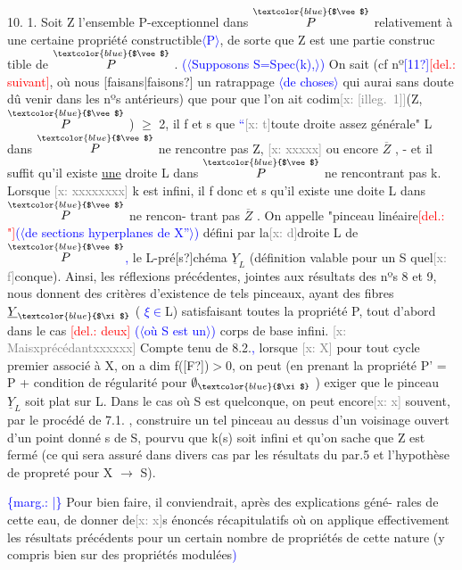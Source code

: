 \documentclass[11pt]{article}
\newcommand{\hand}[1]{\textcolor{blue}{#1}}
\let\over\relax
\newcommand{\over}[2]{\textcolor{gray}{#1}\textcolor{blue}{\ensuremath{^{\!\nearrow}}#2}}
\newcommand{\inserted}[2][]{\textcolor{blue}{$\langle$#2$\rangle$}}
\newcommand{\margin}[1]{\textcolor{blue}{\{\textsf{marg.:} #1\}}}
\newcommand{\deleted}[1]{\textcolor{red}{[\textsf{del.:} #1]}}
\newcommand{\xout}[1]{\textcolor{gray}{[\textsf{x:} #1]}}
\newcommand{\uline}[1]{\underline{#1}}
\newcommand{\unsure}[1]{[#1?]}
\newcommand{\illegible}[1]{[\textsf{illeg.\ #1}]}
\begin{document}
10. 1. Soit Z l'ensemble P-exceptionnel dans $\overset{\hand{$\vee$}}{P}$ relativement à une
certaine propriété constructible\inserted{P}, de sorte que Z est une partie construc%
tible de $\overset{\hand{$\vee$}}{P}$ . \hand{(}\inserted[typed]{Supposons S=Spec(k),}\hand{)} On sait (cf nº\hand{\unsure{11}}\deleted{suivant}, où nous \unsure{faisans|faisons} un ratrappage
\inserted{de choses} qui aurai\over{t}{ent} sans doute dû venir dans les nºs antérieurs) que pour que
l'on ait codim\xout{\illegible{1}}(Z,$\overset{\hand{$\vee$}}{P}$ ) $\geqslant$ 2, il f et s que \hand{``}\xout{t}toute droite assez
générale" L dans $\overset{\hand{$\vee$}}{P}$ ne rencontre pas Z, \xout{xxxxx} ou encore $\overline{Z}$ , - et il suffit
qu'il existe \uline{une} droite L dans $\overset{\hand{$\vee$}}{P}$ ne rencontrant pas k. Lorsque \xout{xxxxxxxx}
k est infini, il f donc et s qu'il existe une doite L dans $\overset{\hand{$\vee$}}{P}$ ne rencon-%
trant pas $\overline{Z}$ . On appelle "pinceau linéaire\deleted{"}\hand{(}\inserted[typed]{de sections hyperplanes de X\hand{''}}\hand{)} défini par la\xout{d}droite
L de $\overset{\hand{$\vee$}}{P}$\hand{,} le L-pré\unsure{s}chéma $\underline{Y}_L$ (définition valable pour un S quel\xout{f}conque).
Ainsi, les réflexions précédentes, jointes aux résultats des nºs 8 et 9,
nous donnent des critères d'existence de tels pinceaux, ayant des fibres
$\underline{Y}_{\hand{$\xi$}}$ ( \hand{$\xi \in$}L) satisfaisant toutes la propriété P, tout d'abord dans le
cas \deleted{deux} \hand{(}\inserted[typed]{où S est un}\hand{)} corps de base infini. \xout{Maisxprécédantxxxxxx} Compte tenu de
8.2.\hand{,} lorsque \xout{X} pour tout cycle premier associé à X, on a dim f(\unsure{F})$>$0,
on peut (en prenant la propriété P' = P + condition de régularité
pour $\emptyset_{\hand{$\xi$}}$ ) exiger que le pinceau $\underline{Y}_L$ soit plat sur L. Dans le cas
où S est quelconque, on peut encore\xout{x} souvent, par le procédé de 7.1. ,
construire un tel pinceau au dessus d'un voisinage ouvert d'un point
donné s de S, pourvu que k(s) soit infini et qu'on sache que Z est fermé
(ce qui sera assuré dans divers cas par les résultats du par.5 et
l'hypothèse de propreté pour X $\rightarrow$ S).

\margin{|} Pour bien faire, il conviendrait, après des explications géné-%
rales de cette eau, de donner de\xout{x}s énoncés récapitulatifs où on
applique effectivement les résultats précédents pour un certain nombre
de propriétés de cette nature (y compris bien sur des propriétés modulées\hand{)}
\end{document}
